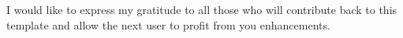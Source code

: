
I would like to express my gratitude to all those who will contribute back to this template and allow the next user to profit from you enhancements.
